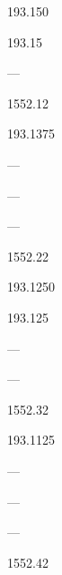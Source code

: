 \documentclass[letterpaper,10pt,english]{sphinxmanual}
\begin{document}
193.150





193.15





—





1552.12









193.1375





—





—





—





1552.22









193.1250





193.125





—





—





1552.32









193.1125





—





—





—





1552.42
\end{document}
